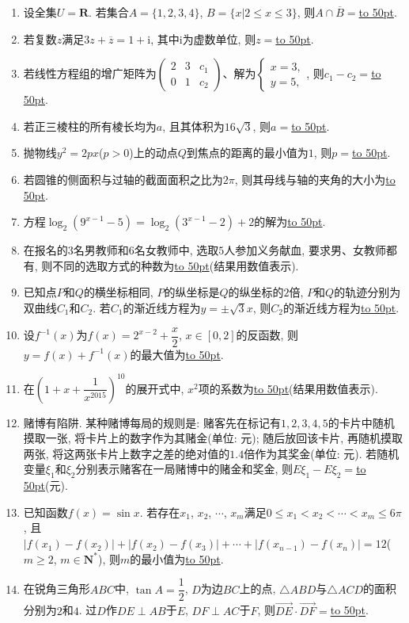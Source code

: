 \documentclass[10pt,a4paper]{article}
\newcommand{\blank}[1]{\underline{\hbox to #1pt{}}}
\begin{document}
\begin{enumerate}[1.]
\item 设全集$U=\mathbf{R}$. 若集合$A=\{1,2,3,4\}$, $B=\{x|2\le x\le 3\}$, 则$A\cap \overline B=$\blank{50}.
\item 若复数$z$满足$3z+\overline z=1+\mathrm{i}$, 其中$\mathrm{i}$为虚数单位, 则$z=$\blank{50}.
\item 若线性方程组的增广矩阵为$\begin{pmatrix}
2 & 3 & c_1  \\0 & 1 & c_2  \end{pmatrix}$、解为$\begin{cases} x=3, \\ y=5, \end{cases}$, 则$c_1-c_2=$\blank{50}.
\item 若正三棱柱的所有棱长均为$a$, 且其体积为$16\sqrt 3$, 则$a=$\blank{50}.
\item 抛物线$y^2=2px$($p>0$)上的动点$Q$到焦点的距离的最小值为$1$, 则$p=$\blank{50}.
\item 若圆锥的侧面积与过轴的截面面积之比为$2\pi$, 则其母线与轴的夹角的大小为\blank{50}.
\item 方程$\log_2(9^{x-1}-5)=\log_2(3^{x-1}-2)+2$的解为\blank{50}.
\item 在报名的$3$名男教师和$6$名女教师中, 选取$5$人参加义务献血, 要求男、女教师都有, 则不同的选取方式的种数为\blank{50}(结果用数值表示).
\item 已知点$P$和$Q$的横坐标相同, $P$的纵坐标是$Q$的纵坐标的$2$倍, $P$和$Q$的轨迹分别为双曲线$C_1$和$C_2$. 若$C_1$的渐近线方程为$y=\pm \sqrt 3x$, 则$C_2$的渐近线方程为\blank{50}.
\item 设$f^{-1}(x)$为$f(x)=2^{x-2}+\dfrac x2$, $x\in [0,2]$的反函数, 则$y=f(x)+f^{-1}(x)$的最大值为\blank{50}.
\item 在$(1+x+\dfrac 1{x^{2015}})^{10}$的展开式中, $x^2$项的系数为\blank{50}(结果用数值表示).
\item 赌博有陷阱. 某种赌博每局的规则是: 赌客先在标记有$1,2,3,4,5$的卡片中随机摸取一张, 将卡片上的数字作为其赌金(单位: 元); 随后放回该卡片, 再随机摸取两张, 将这两张卡片上数字之差的绝对值的$1.4$倍作为其奖金(单位: 元). 若随机变量$\xi _1$和$\xi _2$分别表示赌客在一局赌博中的赌金和奖金, 则$E \xi _1-E \xi _2=$\blank{50}(元).
\item 已知函数$f(x)=\sin x$. 若存在$x_1$, $x_2$, $\cdots$, $x_m$满足$0\le x_1<x_2<\cdots <x_m\le 6\pi$, 且
$|f(x_1)-f(x_2)|+|f(x_2)-f(x_3)|+\cdots +|f(x_{n-1})-f(x_n)|=12$($m\ge 2$, $m\in \mathbf{N}^*$), 则$m$的最小值为\blank{50}.
\item 在锐角三角形$ABC$中, $\tan A=\dfrac 12$, $D$为边$BC$上的点, $\triangle ABD$与$\triangle ACD$的面积分别为$2$和$4$. 过$D$作$DE \perp AB$于$E$, $DF\perp AC$于$F$, 则$\overrightarrow{DE}\cdot \overrightarrow{DF}=$\blank{50}.

\end{enumerate}
\end{document}
